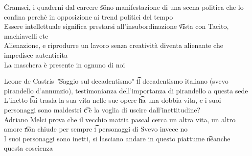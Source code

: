 \documentclass[12pt]{article}
\begin{document}
\v

Gramsci, i quaderni dal carcere \t sono manifestazione di una scena politica che lo confina perchè in opposizione ai trend politici del tempo \\
Essere intellettuale significa prestarsi all'insubordinazione \t vista con Tacito, machiavelli etc \\
Alienazione, e riprodurre un lavoro senza creatività diventa alienante che impedisce autenticita \\
La maschera è presente in ognuno di noi

\v

Leone de Castris \t "Saggio sul decadentismo" \t il decadentismo italiano (svevo pirandello d'annunzio), testimonianza dell'importanza di pirandello a questa sede \\
L'inetto \t lui trasla la sua vita nelle sue opere \t ha una dobbia vita, e i suoi personaggi sono maldestri \t c'è la voglia di uscire dall'inettitudine? \\
Adriano Melci prova che il vecchio mattia pascal cerca un altra vita, un altro amore \t non chiude per sempre \t i personaggi di Svevo invece no \\
I suoi personaggi sono inetti, si lasciano andare in questo piattume \t neanche questa coscienza
\end{document}
